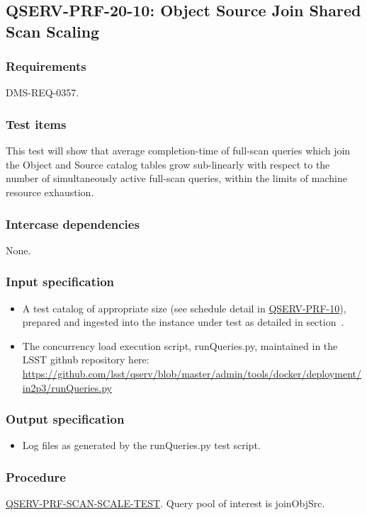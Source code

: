 \subsection{\textsc{QSERV-PRF-20-10}: Object Source Join Shared Scan Scaling}
\label{qserv-prf-20-10}

\subsubsection{Requirements}

DMS-REQ-0357.

\subsubsection{Test items}

This test will show that average completion-time of full-scan queries which join the Object and Source 
catalog tables grow sub-linearly with respect to the number of simultaneously active full-scan queries, within 
the limits of machine resource exhaustion.

\subsubsection{Intercase dependencies}

None.

\subsubsection{Input specification}

\begin{itemize}

  \item{A test catalog of appropriate size (see schedule detail in \hyperref[qserv-prf-10]{\textsc{
  QSERV-PRF-10}}), prepared and ingested into the \product{} instance under test as detailed in 
  section~.}

  \item{The concurrency load execution script, runQueries.py, maintained in the LSST \product{}
  github repository here: \url{https://github.com/lsst/qserv/blob/master/admin/tools/docker/deployment/in2p3/runQueries.py}}

\end{itemize}

\subsubsection{Output specification}

\begin{itemize}
  \item{Log files as generated by the runQueries.py test script.}
\end{itemize}

\subsubsection{Procedure}

\hyperref[qserv-prf-scan-scale-test]{\textsc{QSERV-PRF-SCAN-SCALE-TEST}}.
Query pool of interest is joinObjSrc.
